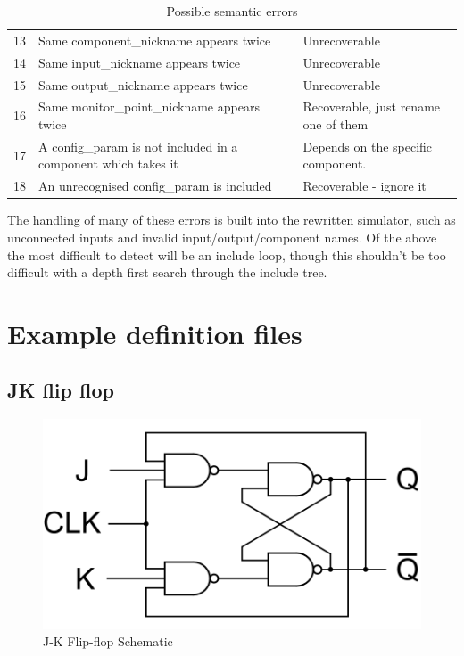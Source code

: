 \documentclass[a4paper]{article}
\begin{document}
\begin{table}[h]
\begin{tabular}{p{0.5cm}p{8cm}p{4cm}}
                13     & Same component\_nickname appears twice                                   & Unrecoverable                                        \\
                14     & Same input\_nickname appears twice                                       & Unrecoverable                                        \\
                15     & Same output\_nickname appears twice                                      & Unrecoverable                                        \\
                16     & Same monitor\_point\_nickname appears twice                              & Recoverable, just rename one of them                 \\
                17     & A config\_param is not included in a component which takes it            & Depends on the specific component.                   \\
                18     & An unrecognised config\_param is included                                & Recoverable - ignore it                              \\ \bottomrule
            \end{tabular}
            \caption{Possible semantic errors}
            \label{tab:semantic-errors}
        \end{table}

        The handling of many of these errors is built into the rewritten simulator, such as unconnected inputs and invalid input/output/component names. Of the above the most difficult to detect will be an include loop, though this shouldn't be too difficult with a depth first search through the include tree.

\section{Example definition files}
    \subsection{JK flip flop}
        

        \begin{figure}[H]
            \centering
            \includegraphics[width=.7\textwidth]{images/jkflipflop_schematic}
            \caption{J-K Flip-flop Schematic}
        \end{figure}
\end{document}
